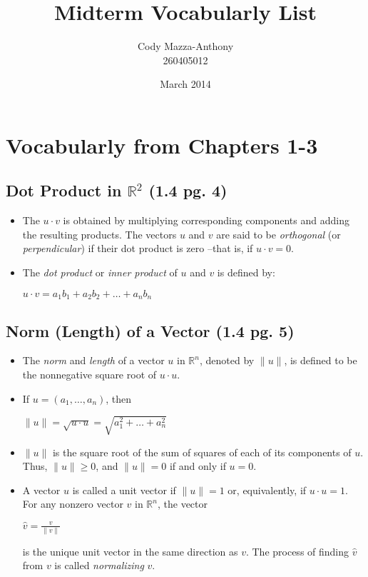 \documentclass[hidelinks, 11pt, openleft]{scrartcl}
\title{Midterm Vocabularly List}
\author{Cody Mazza-Anthony \\ 260405012}
\date{March 2014}
\begin{document}
\maketitle

\section{Vocabularly from Chapters 1-3}
\subsection*{Dot Product in $\mathbb{R}^2$ (1.4 pg. 4)}

\begin{itemize}
    \item The $u \cdot v$ is obtained by multiplying corresponding components and adding the resulting products. The vectors $u$ and $v$ are said to be \textit{orthogonal} (or \textit{perpendicular}) if their dot product is zero --that is, if $u \cdot v = 0$.
    \item The \textit{dot product} or \textit{inner product} of $u$ and $v$ is defined by:
    \begin{center}
        $ u \cdot v = a_{1}b_{1} + a_{2}b_{2} + \dots + a_{n}b_{n}$
    \end{center}
\end{itemize}

\subsection*{Norm (Length) of a Vector (1.4 pg. 5)}

\begin{itemize}
    \item The \textit{norm} and \textit{length} of a vector $u$ in $\mathbb{R}^n$, denoted by $\|u\|$, is defined to be the nonnegative square root of $u \cdot u$. 
    \item If $u = (a_{1}, \dots, a_{n})$, then
        \begin{center}
            $\|u\| = \sqrt{u \cdot u} = \sqrt{a_1^2 + \dots + a_n^2}$ 
        \end{center}
    \item $\|u\|$ is the square root of the sum of squares of each of its components of $u$. Thus, $\|u\| \ge 0$, and $\|u\|=0$ if and only if $u=0$.
    \item A vector $u$ is called a unit vector if $\|u\|=1$ or, equivalently, if $u \cdot u = 1$. For any nonzero vector $v$ in $\mathbb{R}^n$, the vector
        \begin{center}
            $\hat{v} = \frac{v}{\|v\|}$
        \end{center}
        is the unique unit vector in the same direction as $v$. The process of finding $\hat{v}$ from $v$ is called \textit{normalizing} $v$.
\end{itemize}
\end{document}

